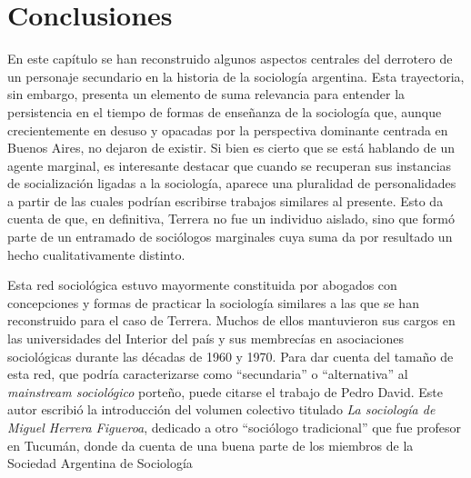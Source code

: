 \section{Conclusiones}

En este capítulo se han reconstruido algunos aspectos centrales del derrotero de un personaje secundario en la historia de la sociología argentina. Esta trayectoria, sin embargo, presenta un elemento de suma relevancia para entender la persistencia en el tiempo de formas de enseñanza de la sociología que, aunque crecientemente en desuso y opacadas por la perspectiva dominante centrada en Buenos Aires, no dejaron de existir. Si bien es cierto que se está hablando de un agente marginal, es interesante destacar que cuando se recuperan sus instancias de socialización ligadas a la sociología, aparece una pluralidad de personalidades a partir de las cuales podrían escribirse trabajos similares al presente. Esto da cuenta de que, en definitiva, Terrera no fue un individuo aislado, sino que formó parte de un entramado de sociólogos marginales cuya suma da por resultado un hecho cualitativamente distinto.

Esta red sociológica estuvo mayormente constituida por abogados con concepciones y formas de practicar la sociología similares a las que se han reconstruido para el caso de Terrera. Muchos de ellos mantuvieron sus cargos en las universidades del Interior del país y sus membrecías en asociaciones sociológicas durante las décadas de 1960 y 1970. Para dar cuenta del tamaño de esta red, que podría caracterizarse como \enquote{secundaria} o \enquote{alternativa} al \emph{mainstream sociológico} porteño, puede citarse el trabajo de Pedro David. Este autor escribió la introducción del volumen colectivo titulado \emph{La sociología de Miguel Herrera Figueroa}, dedicado a otro \enquote{sociólogo tradicional} que fue profesor en Tucumán, donde da cuenta de una buena parte de los miembros de la Sociedad Argentina de Sociología

